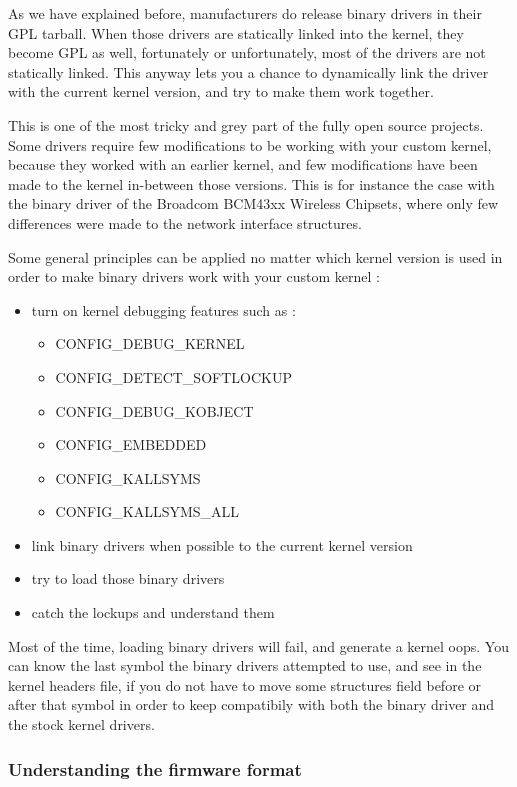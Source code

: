 As we have explained before, manufacturers do release binary drivers in their GPL tarball. When those drivers are statically linked into the kernel, they become GPL as well, fortunately or unfortunately, most of the drivers are not statically linked. This anyway lets you a chance to dynamically link the driver with the current kernel version, and try to make them work together.

This is one of the most tricky and grey part of the fully open source projects. Some drivers require few modifications to be working with your custom kernel, because they worked with an earlier kernel, and few modifications have been made to the kernel in-between those versions. This is for instance the case with the binary driver of the Broadcom BCM43xx Wireless Chipsets, where only few differences were made to the network interface structures.

Some general principles can be applied no matter which kernel version is used in order to make binary drivers work with your custom kernel :

\begin{itemize}
\item turn on kernel debugging features such as :
\begin{itemize}
\item CONFIG\_DEBUG\_KERNEL
\item CONFIG\_DETECT\_SOFTLOCKUP
\item CONFIG\_DEBUG\_KOBJECT
\item CONFIG\_EMBEDDED
\item CONFIG\_KALLSYMS
\item CONFIG\_KALLSYMS\_ALL
\end{itemize}
\item link binary drivers when possible to the current kernel version
\item try to load those binary drivers
\item catch the lockups and understand them
\end{itemize}

Most of the time, loading binary drivers will fail, and generate a kernel oops. You can know the last symbol the binary drivers attempted to use, and see in the kernel headers file, if you do not have to move some structures field before or after that symbol in order to keep compatibily with both the binary driver and the stock kernel drivers.

\subsubsection{Understanding the firmware format}

